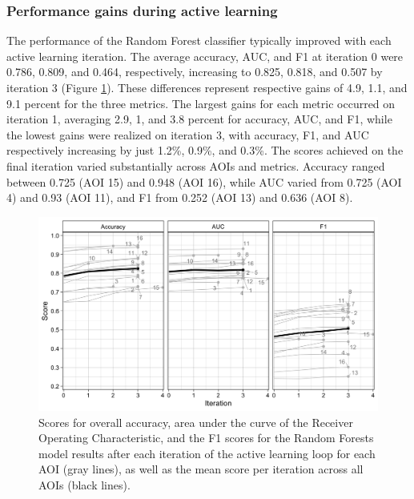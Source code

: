 \documentclass[11pt,a4paper]{article}
\begin{document}
\hypertarget{performance-gains-during-active-learning}{%
\subsubsection{Performance gains during active
learning}\label{performance-gains-during-active-learning}}

The performance of the Random Forest classifier typically improved with
each active learning iteration. The average accuracy, AUC, and F1 at
iteration 0 were 0.786, 0.809, and 0.464, respectively, increasing to
0.825, 0.818, and 0.507 by iteration 3 (Figure \ref{fig:alperformance}).
These differences represent respective gains of 4.9, 1.1, and 9.1
percent for the three metrics. The largest gains for each metric
occurred on iteration 1, averaging 2.9, 1, and 3.8 percent for accuracy,
AUC, and F1, while the lowest gains were realized on iteration 3, with
accuracy, F1, and AUC respectively increasing by just 1.2\%, 0.9\%, and
0.3\%. The scores achieved on the final iteration varied substantially
across AOIs and metrics. Accuracy ranged between 0.725 (AOI 15) and
0.948 (AOI 16), while AUC varied from 0.725 (AOI 4) and 0.93 (AOI 11),
and F1 from 0.252 (AOI 13) and 0.636 (AOI 8).

\begin{figure}

{\centering \includegraphics[width=1\linewidth]{figures/figure4} 

}

\caption{Scores for overall accuracy, area under the curve of the Receiver Operating Characteristic, and the F1 scores for the Random Forests model results after each iteration of the active learning loop for each AOI (gray lines), as well as the mean score per iteration across all AOIs (black lines).}\label{fig:alperformance}
\end{figure}
\end{document}
